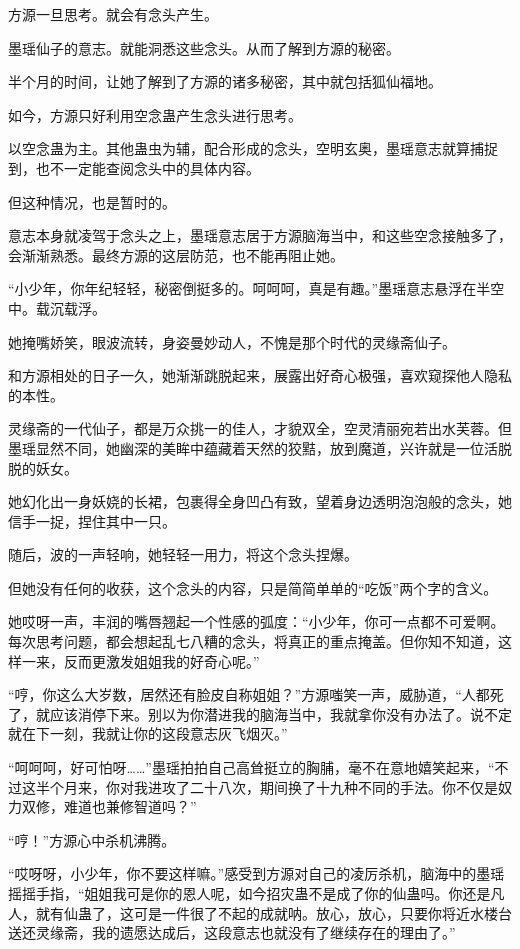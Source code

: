\begin{this_body}
方源一旦思考。就会有念头产生。

墨瑶仙子的意志。就能洞悉这些念头。从而了解到方源的秘密。

半个月的时间，让她了解到了方源的诸多秘密，其中就包括狐仙福地。

如今，方源只好利用空念蛊产生念头进行思考。

以空念蛊为主。其他蛊虫为辅，配合形成的念头，空明玄奥，墨瑶意志就算捕捉到，也不一定能查阅念头中的具体内容。

但这种情况，也是暂时的。

意志本身就凌驾于念头之上，墨瑶意志居于方源脑海当中，和这些空念接触多了，会渐渐熟悉。最终方源的这层防范，也不能再阻止她。

“小少年，你年纪轻轻，秘密倒挺多的。呵呵呵，真是有趣。”墨瑶意志悬浮在半空中。载沉载浮。

她掩嘴娇笑，眼波流转，身姿曼妙动人，不愧是那个时代的灵缘斋仙子。

和方源相处的日子一久，她渐渐跳脱起来，展露出好奇心极强，喜欢窥探他人隐私的本性。

灵缘斋的一代仙子，都是万众挑一的佳人，才貌双全，空灵清丽宛若出水芙蓉。但墨瑶显然不同，她幽深的美眸中蕴藏着天然的狡黠，放到魔道，兴许就是一位活脱脱的妖女。

她幻化出一身妖娆的长裙，包裹得全身凹凸有致，望着身边透明泡泡般的念头，她信手一捉，捏住其中一只。

随后，波的一声轻响，她轻轻一用力，将这个念头捏爆。

但她没有任何的收获，这个念头的内容，只是简简单单的“吃饭”两个字的含义。

她哎呀一声，丰润的嘴唇翘起一个性感的弧度：“小少年，你可一点都不可爱啊。每次思考问题，都会想起乱七八糟的念头，将真正的重点掩盖。但你知不知道，这样一来，反而更激发姐姐我的好奇心呢。”

“哼，你这么大岁数，居然还有脸皮自称姐姐？”方源嗤笑一声，威胁道，“人都死了，就应该消停下来。别以为你潜进我的脑海当中，我就拿你没有办法了。说不定就在下一刻，我就让你的这段意志灰飞烟灭。”

“呵呵呵，好可怕呀……”墨瑶拍拍自己高耸挺立的胸脯，毫不在意地嬉笑起来，“不过这半个月来，你对我进攻了二十八次，期间换了十九种不同的手法。你不仅是奴力双修，难道也兼修智道吗？”

“哼！”方源心中杀机沸腾。

“哎呀呀，小少年，你不要这样嘛。”感受到方源对自己的凌厉杀机，脑海中的墨瑶摇摇手指，“姐姐我可是你的恩人呢，如今招灾蛊不是成了你的仙蛊吗。你还是凡人，就有仙蛊了，这可是一件很了不起的成就呐。放心，放心，只要你将近水楼台送还灵缘斋，我的遗愿达成后，这段意志也就没有了继续存在的理由了。”


\end{this_body}
